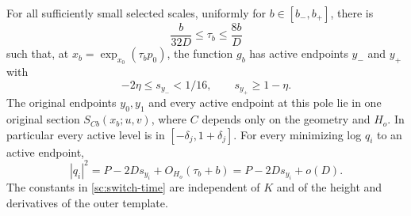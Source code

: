 \begin{lemma}\label{sc:switch}
For all sufficiently small selected scales, uniformly for
$b\in[b_-,b_+]$, there is
\begin{equation}
 \frac b{32D}\leq\tau_b\leq\frac{8b}D
 \label{sc:switch-time}
\end{equation}
such that, at $x_b=\exp_{x_0}(\tau_b p_0)$, the function $g_b$ has
active endpoints $y_-$ and $y_+$ with
\[
 -2\eta\leq s_{y_-}<1/16,\qquad s_{y_+}\geq1-\eta.
\]
The original endpoints $y_0,y_1$ and every active endpoint at this
pole lie in one original section $S_{C b}(x_b;u,v)$, where $C$ depends
only on the geometry and $H_o$.  In particular every active level is
in $[-\delta_j,1+\delta_j]$.
For every minimizing log $q_i$ to an active endpoint,
\begin{equation}
 |q_i|^2=P-2D s_{y_i}+O_{H_o}(\tau_b+b)
        =P-2D s_{y_i}+o(D).
 \label{sc:switch-norms}
\end{equation}
The constants in \eqref{sc:switch-time} are independent of $K$ and
of the height and derivatives of the outer template.
\end{lemma}

